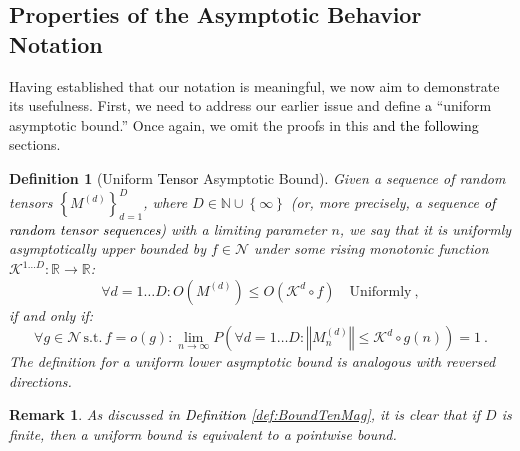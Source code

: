 \documentclass{article} %
\newtheorem{definition}{Definition}[section]
\newtheorem{remark}{Remark}
[section]
\begin{document}
\subsection{Properties of the Asymptotic Behavior Notation}
\label{Zap:sec:PropAsyNot}

Having established that our notation is meaningful, we now aim to demonstrate its usefulness. First, we need to address our earlier issue and define \textcolor{black}{a} ``uniform asymptotic bound.'' Once again, we omit the proofs in this \textcolor{black}{and the following} sections.

\begin{definition}
[Uniform \textcolor{black}{Tensor} Asymptotic Bound]
\label{Zap:def:BoundTenMagUni}
\textup{Given a sequence of random tensors \(\left\{ M^{\left(d\right)}\right\} _{d=1}^{D}\), where \(D\in\mathbb{N}\cup\left\{ \infty\right\} \) (or, more precisely, a sequence \textcolor{black}{of random tensor sequences}) with a limiting parameter \(n\), we say that it is uniformly asymptotically upper bounded by \(f\in\mathcal{N}\) under some rising monotonic function \(\mathcal{K}^{1\ldots D}:\mathbb{R}\rightarrow\mathbb{R}\):
\begin{equation}
\forall d=1\ldots D:O\left(M^{\left(d\right)}\right)\leq O\left(\mathcal{K}^{d}\circ f\right)\quad\text{Uniformly}\ ,
\end{equation}
if and only if:
\begin{equation}
\forall g\in\mathcal{N}\,\text{s.t.}\,f=o\left(g\right):\lim_{n\rightarrow\infty}P\left(\forall d=1\ldots D:\left\Vert M_{n}^{\left(d\right)}\right\Vert \leq\mathcal{K}^{d}\circ g\left(n\right)\right)=1 \ .
\label{eq:BoundTenMag2}
\end{equation}
The definition for a uniform lower asymptotic bound is analogous with reversed directions.
}
\end{definition}

\begin{remark}
\textup{As discussed in \textcolor{black}{Definition} \ref{def:BoundTenMag}, it is clear that if \(D\) is finite, then a uniform bound is equivalent to a pointwise bound.}
\end{remark}
\end{document}

